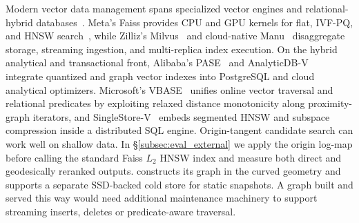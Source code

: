 Modern vector data management spans specialized vector engines and relational-hybrid databases~\cite{pan2024survey}.
Meta's {Faiss} provides CPU and GPU kernels for flat, IVF-PQ, and {HNSW} search~\cite{johnson2019billion,douze2024faiss}, while Zilliz's {Milvus}~\cite{wang2021milvus} and cloud-native {Manu}~\cite{guo2022manu} disaggregate storage, streaming ingestion, and multi-replica index execution.
On the hybrid analytical and transactional front, Alibaba's {PASE}~\cite{yang2020pase} and {AnalyticDB-V}~\cite{wei2020analyticdb} integrate quantized and graph vector indexes into {PostgreSQL} and cloud analytical optimizers.
Microsoft's {VBASE}~\cite{zhang2023vbase} unifies online vector traversal and relational predicates by exploiting relaxed distance monotonicity along proximity-graph iterators, and {SingleStore-V}~\cite{chen2024singlestore} embeds segmented {HNSW} and subspace compression inside a distributed SQL engine.
Origin-tangent candidate search can work well on shallow data. In \S\ref{subsec:eval_external} we apply the origin log-map before calling the standard Faiss $L_2$ HNSW index and measure both direct and geodesically reranked outputs. \rquiver{} constructs its graph in the curved geometry and supports a separate SSD-backed cold store for static snapshots. A graph built and served this way would need additional maintenance machinery to support streaming inserts, deletes or predicate-aware traversal.
